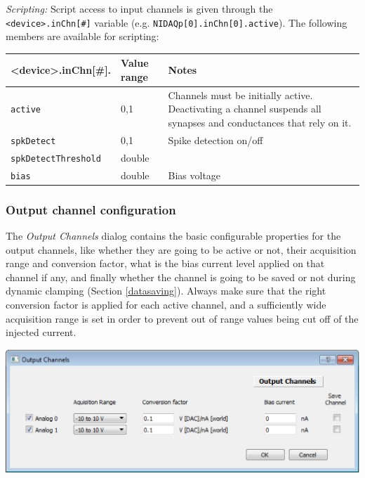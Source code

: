 \documentclass{article}
\begin{document}
\noindent
\emph{Scripting:} Script access to input channels is given through the \texttt{<device>.inChn[\#]} variable
(e.g. \texttt{NIDAQp[0].inChn[0].active}).
The following members are available for scripting: \\
\begin{tabularx}{\linewidth}{|ll|X|}
	\hline
	{\bf \textless{}device\textgreater.inChn[\#].\textvisiblespace} & {\bf Value range} & {\bf Notes} \\
	\hline
	\texttt{active} & 0,1 & Channels must be initially active. Deactivating a channel suspends all
	  synapses and conductances that rely on it. \\
	\texttt{spkDetect} & 0,1 & Spike detection on/off \\
	\texttt{spkDetectThreshold} & double & \\
	\texttt{bias} & double & Bias voltage \\
	\hline
\end{tabularx}


\subsubsection{Output channel configuration} \label{outchnconfig}

The \emph{Output Channels} dialog contains the basic configurable properties
for the output channels, like whether they are going to be active or not,
their acquisition range and conversion factor, what is the bias current
level applied on that channel if any, and finally whether the channel is
going to be saved or not during dynamic clamping (Section
\ref{datasaving}). Always make sure that the right conversion factor is
applied for each active channel, and a sufficiently wide acquisition range
is set in order to prevent out of range values being cut off of the
injected current.\\

\noindent
\parbox{\textwidth}{
	\includegraphics[scale=0.5]{outputChnDialog}
} \\[0.2cm]
\end{document}
